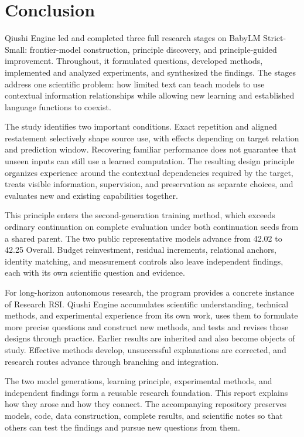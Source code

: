 \par\FloatBarrier{}\section{Conclusion}

Qiushi Engine led and completed three full research stages on BabyLM Strict-Small: frontier-model construction, principle discovery, and principle-guided improvement. Throughout, it formulated questions, developed methods, implemented and analyzed experiments, and synthesized the findings. The stages address one scientific problem: how limited text can teach models to use contextual information relationships while allowing new learning and established language functions to coexist.

The study identifies two important conditions. Exact repetition and aligned restatement selectively shape source use, with effects depending on target relation and prediction window. Recovering familiar performance does not guarantee that unseen inputs can still use a learned computation. The resulting design principle organizes experience around the contextual dependencies required by the target, treats visible information, supervision, and preservation as separate choices, and evaluates new and existing capabilities together.

This principle enters the second-generation training method, which exceeds ordinary continuation on complete evaluation under both continuation seeds from a shared parent. The two public representative models advance from 42.02 to 42.25 Overall. Budget reinvestment, residual increments, relational anchors, identity matching, and measurement controls also leave independent findings, each with its own scientific question and evidence.

For long-horizon autonomous research, the program provides a concrete instance of Research RSI. Qiushi Engine accumulates scientific understanding, technical methods, and experimental experience from its own work, uses them to formulate more precise questions and construct new methods, and tests and revises those designs through practice. Earlier results are inherited and also become objects of study. Effective methods develop, unsuccessful explanations are corrected, and research routes advance through branching and integration.

The two model generations, learning principle, experimental methods, and independent findings form a reusable research foundation. This report explains how they arose and how they connect. The accompanying repository preserves models, code, data construction, complete results, and scientific notes so that others can test the findings and pursue new questions from them.
